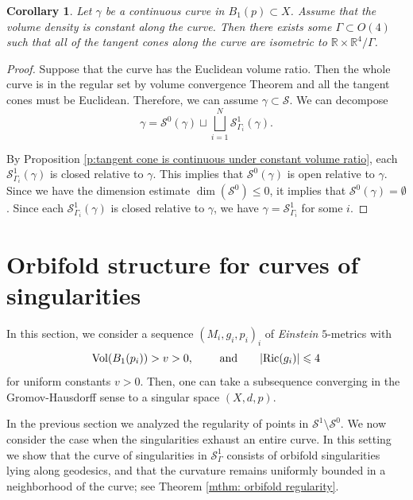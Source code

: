 \documentclass[11pt,reqno]{amsart}
\numberwithin{equation}{section}
\newcommand{\RR}{\mathds{R}}
\newcommand{\Ric}{{\rm Ric}}
\newcommand{\Vol}{{\rm Vol}}
\newcommand{\cS}{\mathcal{S}}
\newtheorem{corollary}[thm]{Corollary}
\theoremstyle{definition}
\theoremstyle{remark}
\begin{document}
\begin{corollary}\label{c:curve constant volume ratio}
    Let $\gamma$ be a continuous curve in $B_1(p) \subset X$. Assume that the volume density is constant along the curve. Then there exists some $\Gamma \subset 
    O(4)$ such that all of the tangent cones along the curve are isometric to $\RR \times \RR^4/\Gamma$. 
\end{corollary}



\begin{proof}
    Suppose that the curve has the Euclidean volume ratio. Then the whole curve is in the regular set by volume convergence Theorem \cite{col} and all the tangent cones must be Euclidean. Therefore, we can assume $\gamma \subset \cS$. We can decompose 
    \begin{equation*}
        \gamma = \cS^0(\gamma) \sqcup \bigsqcup_{i=1}^N \cS^1_{\Gamma_i}(\gamma).
    \end{equation*}

    By Proposition \ref{p:tangent cone is continuous under constant volume ratio}, each $\cS^1_{\Gamma_i}(\gamma)$ is closed relative to $\gamma$. This implies that $\cS^0(\gamma)$ is open relative to $\gamma$. Since we have the dimension estimate $\dim(\cS^0) \leqslant 0$, it implies that $\cS^0(\gamma) = \emptyset$. Since each $\cS^1_{\Gamma_i}(\gamma)$ is closed relative to $\gamma$, we have $\gamma = \cS^1_{\Gamma_i}$ for some $i$.
\end{proof}








\section{Orbifold structure for curves of singularities}\label{s:orbifold structure}


In this section, we consider a sequence $(M_i,g_i,p_i)_i$ of \emph{Einstein} $5$-metrics with 
$$\Vol(B_1(p_i))> v>0, \qquad \text{ and}\qquad|\Ric(g_i)|\leqslant 4$$
for uniform constants $v>0$. Then, one can take a subsequence converging in the Gromov-Hausdorff sense to a singular space $(X,d,p)$. 

In the previous section we analyzed the regularity of points in $\cS^1 \setminus \cS^0$.  
We now consider the case when the singularities exhaust an entire curve.  
In this setting we show that the curve of singularities in $\cS^1_{\Gamma}$ consists of orbifold singularities lying along geodesics, and that the curvature remains uniformly bounded in a neighborhood of the curve; see Theorem \ref{mthm: orbifold regularity}. 
\end{document}
